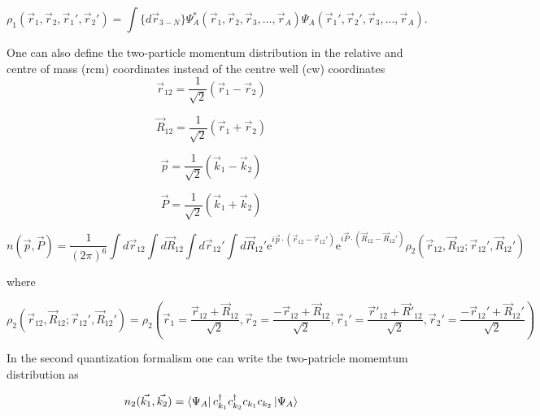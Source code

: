 \documentclass[12pt]{article}
\begin{document}
\begin{equation}
\rho_1(\vec{r}_1,\vec{r}_2, \vec{r}_1',\vec{r}_2') = \int \{d\vec{r}_{3-N}\} \Psi^*_A(\vec{r}_1,\vec{r}_2,\vec{r}_3, ... ,\vec{r}_A)\Psi_A(\vec{r}_1',\vec{r}_2',\vec{r}_3, ... ,\vec{r}_A).
\end{equation}

One can also define the two-particle momentum distribution in the relative and centre of mass (rcm) coordinates instead of the centre well (cw) coordinates
\begin{equation}
\vec{r}_{12}= \frac{1}{\sqrt{2}} \left(\vec{r}_1 - \vec{r}_2\right)  
\end{equation}

\begin{equation}
\vec{R}_{12}= \frac{1}{\sqrt{2}} \left(\vec{r}_1 + \vec{r}_2\right)
\end{equation}

\begin{equation}
\vec{p}= \frac{1}{\sqrt{2}} \left(\vec{k}_1 - \vec{k}_2\right)
\end{equation}

\begin{equation}
\vec{P}= \frac{1}{\sqrt{2}} \left(\vec{k}_1 + \vec{k}_2\right)
\end{equation}


\begin{equation}
n(\vec{p},\vec{P})=\frac{1}{(2\pi)^6}
						\int d\vec{r}_{12} \int d\vec{R}_{12} \int d\vec{r}_{12}' \int d\vec{R}_{12}' 
    						\mathrm{e}^{i\vec{p}\cdot (\vec{r}_{12}-\vec{r}_{12}')} 
    						\mathrm{e}^{i\vec{P}\cdot(\vec{R}_{12}-\vec{R}_{12}')} 
    						\rho_2(\vec{r}_{12},\vec{R}_{12}; \vec{r}_{12}',\vec{R}_{12}')
\end{equation}

where 

\begin{equation}
\rho_2(\vec{r}_{12},\vec{R}_{12}; \vec{r}_{12}',\vec{R}_{12}') = 
							\rho_2\left(	
							\vec{r}_1=\frac{\vec{r}_{12} + \vec{R}_{12}}{\sqrt{2}},
							\vec{r}_2=\frac{-\vec{r}_{12} + \vec{R}_{12}}{\sqrt{2}},
						    \vec{r}_1'=\frac{\vec{r}'_{12} + \vec{R}'_{12}}{\sqrt{2}},	
						    \vec{r}_2'=\frac{-\vec{r}_{12}' + \vec{R}_{12}'}{\sqrt{2}}
						    \right)
\end{equation}

In the second quantization formalism one can write the two-patricle momemtum distribution as

\begin{equation}
n_2(\vec{k_1},\vec{k_2})= \bra{\Psi_A} c^\dagger_{k_1} c^\dagger_{k_2} c_{k_1} c_{k_2} \ket{\Psi_A}
\end{equation}
\end{document}
